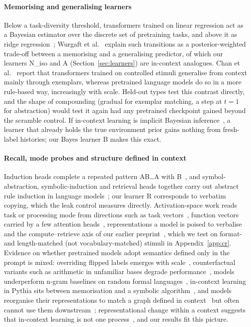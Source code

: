 \documentclass[11pt]{article}
\begin{document}
\paragraph{Memorising and generalising learners}

Below a task-diversity threshold, transformers trained on linear regression act as a Bayesian estimator over the discrete set of pretraining tasks, and above it as ridge regression~\cite{raventos2023}; Wurgaft et al.~\cite{wurgaft2025} explain such transitions as a posterior-weighted trade-off between a memorising and a generalising predictor, of which our learners N\_iso and A (Section~\ref{sec:learners}) are in-context analogues. Chan et al.~\cite{chan2022} report that transformers trained on controlled stimuli generalise from context mainly through exemplars, whereas pretrained language models do so in a more rule-based way, increasingly with scale. Held-out types test this contrast directly, and the shape of compounding (gradual for exemplar matching, a step at $t = 1$ for abstraction) would test it again had any pretrained checkpoint gained beyond the scramble control. If in-context learning is implicit Bayesian inference~\cite{xie2021}, a learner that already holds the true environment prior gains nothing from fresh-label histories; our Bayes learner B makes this exact.

\paragraph{Recall, mode probes and structure defined in context}

Induction heads complete a repeated pattern AB\ldots{}A with B~\cite{olsson2022}, and symbol-abstraction, symbolic-induction and retrieval heads together carry out abstract rule induction in language models~\cite{yang2025symbolic}; our learner R corresponds to verbatim copying, which the leak control measures directly. Activation-space work reads task or processing mode from directions such as task vectors~\cite{hendel2023}, function vectors carried by a few attention heads~\cite{todd2023fv}, representations a model is poised to verbalise~\cite{gurnee2026workspace} and the compute--retrieve axis of our earlier preprint~\cite{ramdan2026cr}, which we test on format- and length-matched (not vocabulary-matched) stimuli in Appendix~\ref{app:cr}. Evidence on whether pretrained models adopt semantics defined only in the prompt is mixed: overriding flipped labels emerges with scale~\cite{wei2023larger}, counterfactual variants such as arithmetic in unfamiliar bases degrade performance~\cite{wu2024reasoning}, models underperform n-gram baselines on random formal languages~\cite{gupta2025random}, in-context learning in Pythia sits between memorisation and a symbolic algorithm~\cite{niu2025illusion}, and models reorganise their representations to match a graph defined in context~\cite{park2024iclr} but often cannot use them downstream~\cite{lepori2026}; representational change within a context suggests that in-context learning is not one process~\cite{hosseini2026}, and our results fit this picture.
\end{document}
